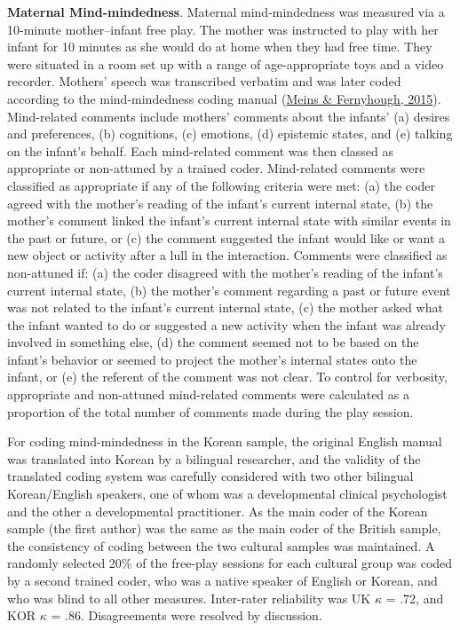 \documentclass[
]{article}
\begin{document}
\textbf{Maternal Mind-mindedness}. Maternal mind-mindedness was measured via a 10-minute mother--infant free play. The mother was instructed to play with her infant for 10 minutes as she would do at home when they had free time. They were situated in a room set up with a range of age-appropriate toys and a video recorder. Mothers' speech was transcribed verbatim and was later coded according to the mind-mindedness coding manual (\protect\hyperlink{ref-Meins2015}{Meins \& Fernyhough, 2015}). Mind-related comments include mothers' comments about the infants' (a) desires and preferences, (b) cognitions, (c) emotions, (d) epistemic states, and (e) talking on the infant's behalf. Each mind-related comment was then classed as appropriate or non-attuned by a trained coder. Mind-related comments were classified as appropriate if any of the following criteria were met: (a) the coder agreed with the mother's reading of the infant's current internal state, (b) the mother's comment linked the infant's current internal state with similar events in the past or future, or (c) the comment suggested the infant would like or want a new object or activity after a lull in the interaction. Comments were classified as non-attuned if: (a) the coder disagreed with the mother's reading of the infant's current internal state, (b) the mother's comment regarding a past or future event was not related to the infant's current internal state, (c) the mother asked what the infant wanted to do or suggested a new activity when the infant was already involved in something else, (d) the comment seemed not to be based on the infant's behavior or seemed to project the mother's internal states onto the infant, or (e) the referent of the comment was not clear. To control for verbosity, appropriate and non-attuned mind-related comments were calculated as a proportion of the total number of comments made during the play session.

For coding mind-mindedness in the Korean sample, the original English manual was translated into Korean by a bilingual researcher, and the validity of the translated coding system was carefully considered with two other bilingual Korean/English speakers, one of whom was a developmental clinical psychologist and the other a developmental practitioner. As the main coder of the Korean sample (the first author) was the same as the main coder of the British sample, the consistency of coding between the two cultural samples was maintained. A randomly selected 20\% of the free-play sessions for each cultural group was coded by a second trained coder, who was a native speaker of English or Korean, and who was blind to all other measures. Inter-rater reliability was UK \(\kappa\) = .72, and KOR \(\kappa\) = .86. Disagreements were resolved by discussion.
\end{document}
